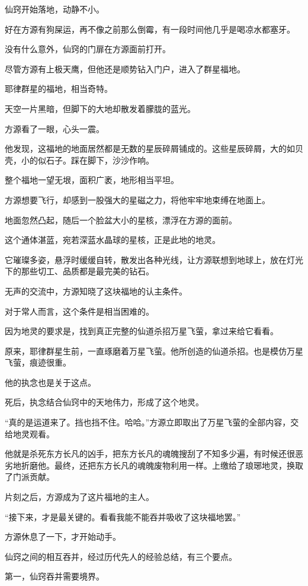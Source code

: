 \begin{this_body}
仙窍开始落地，动静不小。

好在方源有狗屎运，再不像之前那么倒霉，有一段时间他几乎是喝凉水都塞牙。

没有什么意外，仙窍的门扉在方源面前打开。

尽管方源有上极天鹰，但他还是顺势钻入门户，进入了群星福地。

耶律群星的福地，相当奇特。

天空一片黑暗，但脚下的大地却散发着朦胧的蓝光。

方源看了一眼，心头一震。

他发现，这福地的地面居然都是无数的星辰碎屑铺成的。这些星辰碎屑，大的如贝壳，小的似石子。踩在脚下，沙沙作响。

整个福地一望无垠，面积广袤，地形相当平坦。

方源想要飞行，却感到一股强大的星磁之力，将他牢牢地束缚在地面上。

地面忽然凸起，随后一个脸盆大小的星核，漂浮在方源的面前。

这个通体湛蓝，宛若深蓝水晶球的星核，正是此地的地灵。

它璀璨多姿，悬浮时缓缓自转，散发出各种光线，让方源联想到地球上，放在灯光下的那些切工、品质都是最完美的钻石。

无声的交流中，方源知晓了这块福地的认主条件。

对于常人而言，这个条件是相当困难的。

因为地灵的要求是，找到真正完整的仙道杀招万星飞萤，拿过来给它看看。

原来，耶律群星生前，一直琢磨着万星飞萤。他所创造的仙道杀招。也是模仿万星飞萤，痕迹很重。

他的执念也是关于这点。

死后，执念结合仙窍中的天地伟力，形成了这个地灵。

“真的是运道来了。挡也挡不住。哈哈。”方源立即取出了万星飞萤的全部内容，交给地灵观看。

他就是杀死东方长凡的凶手，把东方长凡的魂魄搜刮了不知多少遍，有时候还很恶劣地折磨他。最终，还把东方长凡的魂魄废物利用一样。上缴给了琅琊地灵，换取了门派贡献。

片刻之后，方源成为了这片福地的主人。

“接下来，才是最关键的。看看我能不能吞并吸收了这块福地罢。”

方源休息了一下，才开始动手。

仙窍之间的相互吞并，经过历代先人的经验总结，有三个要点。

第一，仙窍吞并需要境界。


\end{this_body}
